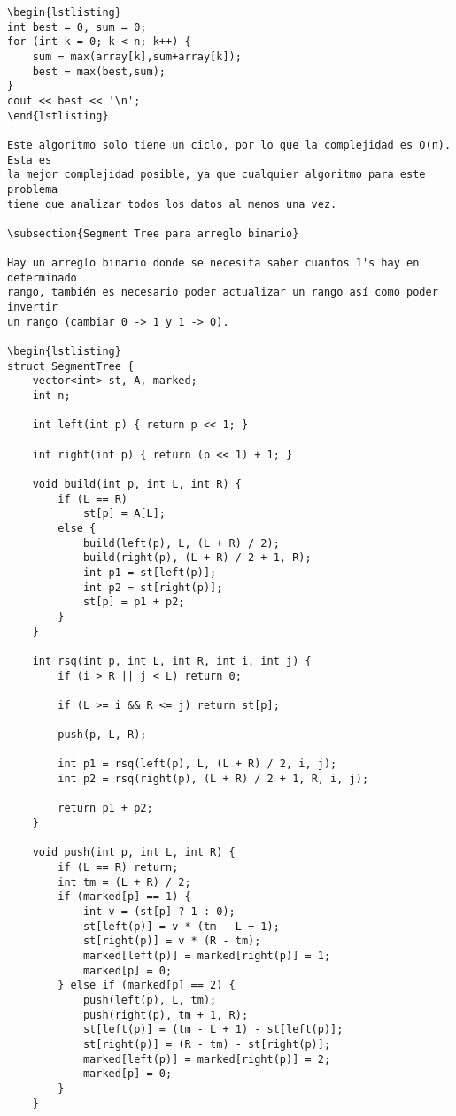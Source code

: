 \documentclass[11pt]{article}
\begin{document}
\begin{verbatim}
\begin{lstlisting}
int best = 0, sum = 0;
for (int k = 0; k < n; k++) {
    sum = max(array[k],sum+array[k]);
    best = max(best,sum);
}
cout << best << '\n';
\end{lstlisting}

Este algoritmo solo tiene un ciclo, por lo que la complejidad es O(n). Esta es
la mejor complejidad posible, ya que cualquier algoritmo para este problema
tiene que analizar todos los datos al menos una vez.

\subsection{Segment Tree para arreglo binario}

Hay un arreglo binario donde se necesita saber cuantos 1's hay en determinado
rango, también es necesario poder actualizar un rango así como poder invertir
un rango (cambiar 0 -> 1 y 1 -> 0).

\begin{lstlisting}
struct SegmentTree {
    vector<int> st, A, marked;
    int n;

    int left(int p) { return p << 1; }

    int right(int p) { return (p << 1) + 1; }

    void build(int p, int L, int R) {
        if (L == R)
            st[p] = A[L];
        else {
            build(left(p), L, (L + R) / 2);
            build(right(p), (L + R) / 2 + 1, R);
            int p1 = st[left(p)];
            int p2 = st[right(p)];
            st[p] = p1 + p2;
        }
    }

    int rsq(int p, int L, int R, int i, int j) {
        if (i > R || j < L) return 0;

        if (L >= i && R <= j) return st[p];

        push(p, L, R);

        int p1 = rsq(left(p), L, (L + R) / 2, i, j);
        int p2 = rsq(right(p), (L + R) / 2 + 1, R, i, j);

        return p1 + p2;
    }

    void push(int p, int L, int R) {
        if (L == R) return;
        int tm = (L + R) / 2;
        if (marked[p] == 1) {
            int v = (st[p] ? 1 : 0);
            st[left(p)] = v * (tm - L + 1);
            st[right(p)] = v * (R - tm);
            marked[left(p)] = marked[right(p)] = 1;
            marked[p] = 0;
        } else if (marked[p] == 2) {
            push(left(p), L, tm);
            push(right(p), tm + 1, R);
            st[left(p)] = (tm - L + 1) - st[left(p)];
            st[right(p)] = (R - tm) - st[right(p)];
            marked[left(p)] = marked[right(p)] = 2;
            marked[p] = 0;
        }
    }


\end{verbatim}
\end{document}

